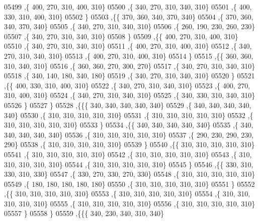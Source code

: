 \begin{DoxyCode}
05499     ,\{   400,   270,   310,   400,   310\}
05500     ,\{   340,   270,   310,   340,   310\}
05501     ,\{   400,   330,   310,   400,   310\}
05502     \}
05503    ,\{\{   370,   360,   340,   370,   340\}
05504     ,\{   370,   360,   340,   370,   340\}
05505     ,\{   340,   270,   310,   340,   310\}
05506     ,\{   260,   190,   230,   260,   230\}
05507     ,\{   340,   270,   310,   340,   310\}
05508     \}
05509    ,\{\{   400,   270,   310,   400,   310\}
05510     ,\{   340,   270,   310,   340,   310\}
05511     ,\{   400,   270,   310,   400,   310\}
05512     ,\{   340,   270,   310,   340,   310\}
05513     ,\{   400,   270,   310,   400,   310\}
05514     \}
05515    ,\{\{   360,   360,   310,   340,   310\}
05516     ,\{   360,   360,   270,   300,   270\}
05517     ,\{   340,   270,   310,   340,   310\}
05518     ,\{   340,   140,   180,   340,   180\}
05519     ,\{   340,   270,   310,   340,   310\}
05520     \}
05521    ,\{\{   400,   330,   310,   400,   310\}
05522     ,\{   340,   270,   310,   340,   310\}
05523     ,\{   400,   270,   310,   400,   310\}
05524     ,\{   340,   270,   310,   340,   310\}
05525     ,\{   340,   330,   310,   340,   310\}
05526     \}
05527    \}
05528   ,\{\{\{   340,   340,   340,   340,   340\}
05529     ,\{   340,   340,   340,   340,   340\}
05530     ,\{   310,   310,   310,   310,   310\}
05531     ,\{   310,   310,   310,   310,   310\}
05532     ,\{   310,   310,   310,   310,   310\}
05533     \}
05534    ,\{\{   340,   340,   340,   340,   340\}
05535     ,\{   340,   340,   340,   340,   340\}
05536     ,\{   310,   310,   310,   310,   310\}
05537     ,\{   290,   230,   290,   230,   290\}
05538     ,\{   310,   310,   310,   310,   310\}
05539     \}
05540    ,\{\{   310,   310,   310,   310,   310\}
05541     ,\{   310,   310,   310,   310,   310\}
05542     ,\{   310,   310,   310,   310,   310\}
05543     ,\{   310,   310,   310,   310,   310\}
05544     ,\{   310,   310,   310,   310,   310\}
05545     \}
05546    ,\{\{   330,   310,   330,   310,   330\}
05547     ,\{   330,   270,   330,   270,   330\}
05548     ,\{   310,   310,   310,   310,   310\}
05549     ,\{   180,   180,   180,   180,   180\}
05550     ,\{   310,   310,   310,   310,   310\}
05551     \}
05552    ,\{\{   310,   310,   310,   310,   310\}
05553     ,\{   310,   310,   310,   310,   310\}
05554     ,\{   310,   310,   310,   310,   310\}
05555     ,\{   310,   310,   310,   310,   310\}
05556     ,\{   310,   310,   310,   310,   310\}
05557     \}
05558    \}
05559   ,\{\{\{   340,   230,   340,   310,   340\}

\end{DoxyCode}
